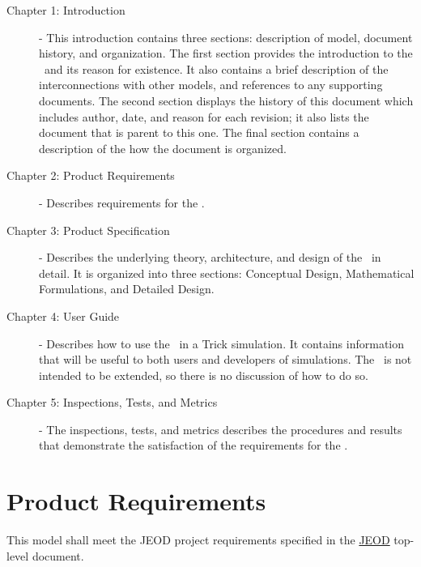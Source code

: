 \begin{description}

\item[Chapter 1: Introduction] - 
This introduction contains three sections: description of model, document history, and organization.  
The first section provides the introduction to the \LvlhFrameDesc\ and its reason 
for existence.  It also contains a brief description of the interconnections with other models, and 
references to any supporting documents.  The second section displays the history of this document which includes
author, date, and reason for each revision; it also lists the document that is parent to this one.  The final
section contains a description of the how the document is organized.

\item[Chapter 2: Product Requirements] - 
Describes requirements for the \LvlhFrameDesc.

\item[Chapter 3: Product Specification] - 
Describes the underlying theory, architecture, and design of the \LvlhFrameDesc\ in detail.  It is organized into
three sections: Conceptual Design, Mathematical Formulations, and Detailed Design.

\item[Chapter 4: User Guide] - 
Describes how to use the \LvlhFrameDesc\ in a Trick simulation.  It contains information that will be useful to
both users and developers of simulations. The \LvlhFrameDesc\ is not intended to be extended, so there is no
discussion of how to do so.

\item[Chapter 5: Inspections, Tests, and Metrics] -  
The inspections, tests, and metrics describes the procedures and results that demonstrate the satisfaction of the
requirements for the \LvlhFrameDesc.

\end{description}


\chapter{Product Requirements}\label{ch:reqt}
This model shall meet the JEOD project requirements specified in the 
\hyperref{file:\JEODHOME/docs/JEOD.pdf}{part1}{reqt}{JEOD} top-level document.

%
%      
%   
%
%

